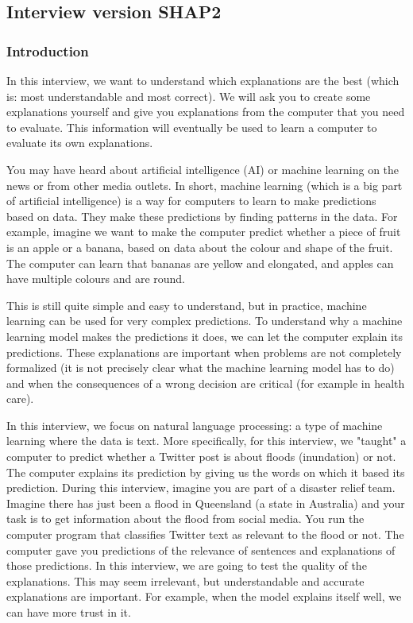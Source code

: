 \subsection{Interview version SHAP2}
\subsubsection*{Introduction}
In this interview, we want to understand which explanations are the best (which is: most understandable and most correct). We will ask you to create some explanations yourself and give you explanations from the computer that you need to evaluate. This information will eventually be used to learn a computer to evaluate its own explanations.

You may have heard about artificial intelligence (AI) or machine learning on the news or from other media outlets. In short, machine learning (which is a big part of artificial intelligence) is a way for computers to learn to make predictions based on data. They make these predictions by finding patterns in the data. For example, imagine we want to make the computer predict whether a piece of fruit is an apple or a banana, based on data about the colour and shape of the fruit. The computer can learn that bananas are yellow and elongated, and apples can have multiple colours and are round.

This is still quite simple and easy to understand, but in practice, machine learning can be used for very complex predictions. To understand why a machine learning model makes the predictions it does, we can let the computer explain its predictions. These explanations are important when problems are not completely formalized (it is not precisely clear what the machine learning model has to do) and when the consequences of a wrong decision are critical (for example in health care).

In this interview, we focus on natural language processing: a type of machine learning where the data is text. More specifically, for this interview, we "taught" a computer to predict whether a Twitter post is about floods (inundation) or not. The computer explains its prediction by giving us the words on which it based its prediction. During this interview, imagine you are part of a disaster relief team. Imagine there has just been a flood in Queensland (a state in Australia) and your task is to get information about the flood from social media. You run the computer program that classifies Twitter text as relevant to the flood or not. The computer gave you predictions of the relevance of sentences and explanations of those predictions. In this interview, we are going to test the quality of the explanations. This may seem irrelevant, but understandable and accurate explanations are important. For example, when the model explains itself well, we can have more trust in it.


